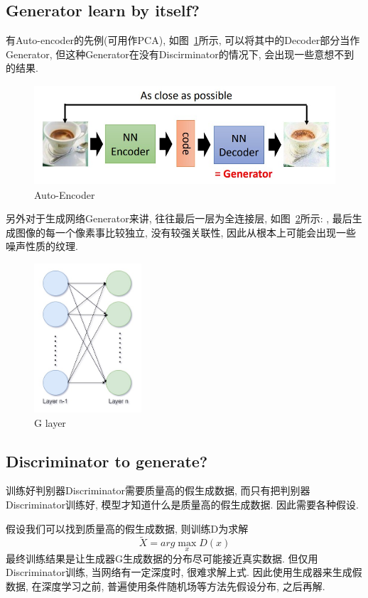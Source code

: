 \subsection{Generator learn by itself?}
有Auto-encoder的先例(可用作PCA), 如图~\ref{fig:0204}所示, 可以将其中的Decoder部分当作Generator, 但这种Generator在没有Discirminator的情况下, 会出现一些意想不到的结果. 
\begin{figure}[!htbp]
    \centering
    \includegraphics[height=10em]{pic/pic0204.jpg}
    \caption{Auto-Encoder}
    \label{fig:0204}
\end{figure}

另外对于生成网络Generator来讲, 往往最后一层为全连接层, 如图~\ref{fig:0205}所示: , 最后生成图像的每一个像素事比较独立, 没有较强关联性, 因此从根本上可能会出现一些噪声性质的纹理. 
\begin{figure}[!htbp]
    \centering
    \includegraphics[height=15em]{pic/pic0205.jpg}
    \caption{G layer}
    \label{fig:0205}
\end{figure}

\subsection{Discriminator to generate?}
训练好判别器Discriminator需要质量高的假生成数据, 而只有把判别器Discriminator训练好, 模型才知道什么是质量高的假生成数据. 因此需要各种假设.

假设我们可以找到质量高的假生成数据, 则训练D为求解
$$ \tilde{X}=arg \max \limits_{x} D(x)$$
最终训练结果是让生成器G生成数据的分布尽可能接近真实数据. 但仅用Discriminator训练, 当网络有一定深度时, 很难求解上式. 因此使用生成器来生成假数据, 在深度学习之前, 普遍使用条件随机场等方法先假设分布, 之后再解.

